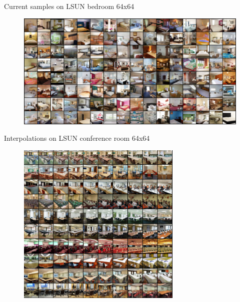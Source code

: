 \documentclass[10pt, handout]{beamer}
\begin{document}
\begin{frame}{Current samples on LSUN bedroom 64x64}
\begin{figure}
    \centering
    \includegraphics[width=\textwidth]{images/samples}
\end{figure}
\end{frame}


\begin{frame}{Interpolations on LSUN conference room 64x64}
\begin{figure}
    \centering
    \includegraphics[width=0.7\textwidth]{images/interpolations-conference-room}
\end{figure}
\end{frame}
\end{document}
